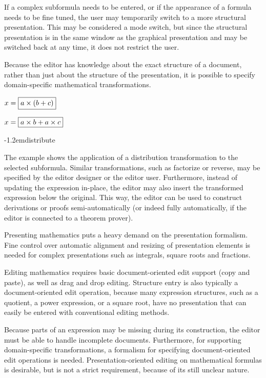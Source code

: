 \documentclass{entcs}
\begin{document}
If a complex subformula needs to be entered, or if the appearance of a formula needs to be fine tuned, the user may temporarily switch to a more structural presentation. This may be considered a mode switch, but since the structural presentation is in the same window as the graphical presentation and may be switched back at any time, it does not restrict the user.


Because the editor has knowledge about the exact structure of a document, rather than just about the structure of the presentation, it is possible to specify domain-specific mathematical transformations.

\editStepScrshot
{\begin{scriptsize}$x = \framebox{$a \times (b + c)$}$\end{scriptsize}}
{\begin{scriptsize}$x = \framebox{$a \times b + a \times c$}$\end{scriptsize}}
{-1.2em}{\small distribute}

The example shows the application of a distribution transformation to the selected subformula. Similar transformations, such as factorize or reverse, may be specified by the editor designer or the editor user. Furthermore, instead of updating the expression in-place, the editor may also insert the transformed expression below the original. This way, the editor can be used to construct derivations or proofs semi-automatically (or indeed fully automatically, if the editor is connected to a theorem prover).


Presenting mathematics puts a heavy demand on the presentation formalism. Fine control over automatic alignment and resizing of presentation elements is needed for complex presentations such as integrals, square roots and fractions. 

Editing mathematics requires basic document-oriented edit support (copy and paste), as well as drag and drop editing. Structure entry is also typically a document-oriented edit operation, because many expression structures, such as a quotient, a power expression, or a square root, have no presentation that can easily be entered with conventional editing methods.

Because parts of an expression may be missing during its construction,  the editor must be able to handle incomplete documents. Furthermore, for supporting domain-specific transformations, a formalism for specifying document-oriented edit operations is needed. Presentation-oriented editing on mathematical formulas is desirable, but is not a strict requirement, because of its still unclear nature.
\end{document}
